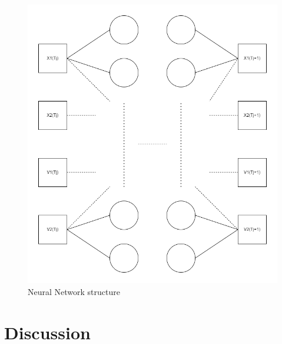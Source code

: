 \documentclass[12pt, a4paper]{article}
\begin{document}
\begin{figure}
    \centering
    \includegraphics[scale=0.5]{../NN_graph.png}
    \caption[]{Neural Network structure}
    \label{fig:neural_network}
\end{figure}

\section{Discussion}
\end{document}
